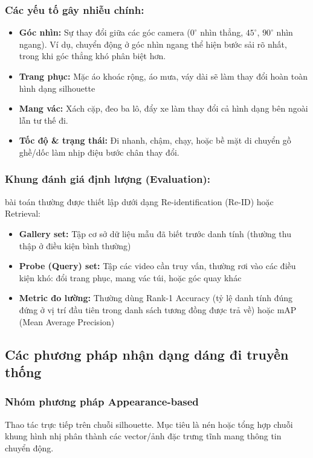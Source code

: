 \subsubsection{Các yếu tố gây nhiễu chính:} 
    \begin{itemize}
        \item \textbf{Góc nhìn:} Sự thay đổi giữa các góc camera ($0^\circ$ nhìn thẳng, $45^\circ$, $90^\circ$ nhìn ngang). Ví dụ, chuyển động ở góc nhìn ngang thể hiện bước sải rõ nhất, trong khi góc thẳng khó phân biệt hơn.
        \item \textbf{Trang phục:} Mặc áo khoác rộng, áo mưa, váy dài sẽ làm thay đổi hoàn toàn hình dạng silhouette
        \item \textbf{Mang vác:} Xách cặp, đeo ba lô, đẩy xe làm thay đổi cả hình dạng bên ngoài lẫn tư thế đi.
        \item \textbf{Tốc độ \& trạng thái:} Đi nhanh, chậm, chạy, hoặc bề mặt di chuyển gồ ghề/dốc làm nhịp điệu bước chân thay đổi.
    \end{itemize}

\subsubsection{Khung đánh giá định lượng (Evaluation):} bài toán thường được thiết lập dưới dạng Re-identification (Re-ID) hoặc Retrieval:
    \begin{itemize}
        \item \textbf{Gallery set:} Tập cơ sở dữ liệu mẫu đã biết trước danh tính (thường thu thập ở điều kiện bình thường)
        \item \textbf{Probe (Query) set:} Tập các video cần truy vấn, thường rơi vào các điều kiện khó: đổi trang phục, mang vác túi, hoặc góc quay khác
        \item \textbf{Metric đo lường:} Thường dùng Rank-1 Accuracy (tỷ lệ danh tính đúng đứng ở vị trí đầu tiên trong danh sách tương đồng được trả về) hoặc mAP (Mean Average Precision)
    \end{itemize}

\subsection{Các phương pháp nhận dạng dáng đi truyền thống}

\subsubsection{Nhóm phương pháp Appearance-based} 
Thao tác trực tiếp trên chuỗi silhouette. Mục tiêu là nén hoặc tổng hợp chuỗi khung hình nhị phân thành các vector/ảnh đặc trưng tĩnh mang thông tin chuyển động.


